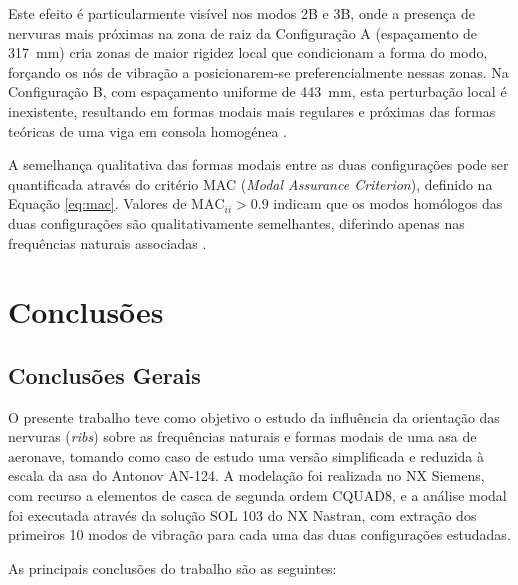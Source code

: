 \documentclass[a4paper,fleqn]{cas-sc}
\begin{document}
Este efeito é particularmente visível nos modos 2B e 3B, onde a presença de nervuras mais próximas na zona de raiz da Configuração A (espaçamento de \SI{317}{\milli\meter}) cria zonas de maior rigidez local que condicionam a forma do modo, forçando os nós de vibração a posicionarem-se preferencialmente nessas zonas. Na Configuração B, com espaçamento uniforme de \SI{443}{\milli\meter}, esta perturbação local é inexistente, resultando em formas modais mais regulares e próximas das formas teóricas de uma viga em consola homogénea \cite{Rao2011}.

A semelhança qualitativa das formas modais entre as duas configurações pode ser quantificada através do critério MAC (\textit{Modal Assurance Criterion}), definido na Equação \eqref{eq:mac}. Valores de $\text{MAC}_{ii} > 0.9$ indicam que os modos homólogos das duas configurações são qualitativamente semelhantes, diferindo apenas nas frequências naturais associadas \cite{Allemang1982, Ewins2000}.

\clearpage

\section{Conclusões}
\label{chap:conclusoes}

\subsection{Conclusões Gerais}

O presente trabalho teve como objetivo o estudo da influência da orientação das nervuras (\textit{ribs}) sobre as frequências naturais e formas modais de uma asa de aeronave, tomando como caso de estudo uma versão simplificada e reduzida à escala da asa do Antonov AN-124. A modelação foi realizada no NX Siemens, com recurso a elementos de casca de segunda ordem CQUAD8, e a análise modal foi executada através da solução SOL 103 do NX Nastran, com extração dos primeiros 10 modos de vibração para cada uma das duas configurações estudadas.

As principais conclusões do trabalho são as seguintes:
\end{document}

